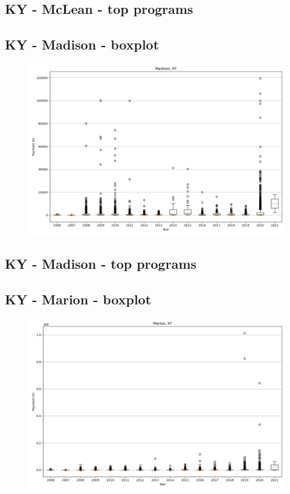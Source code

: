 \subsection*{KY - McLean - top programs}

\newpage
\subsection*{KY - Madison - boxplot}
\begin{figure}[h]
\centering
\includegraphics[width=7in]{../output/boxplots/counties/Madison-KY_boxplot.png}
\end{figure}


\subsection*{KY - Madison - top programs}

\newpage
\subsection*{KY - Marion - boxplot}
\begin{figure}[h]
\centering
\includegraphics[width=7in]{../output/boxplots/counties/Marion-KY_boxplot.png}
\end{figure}


